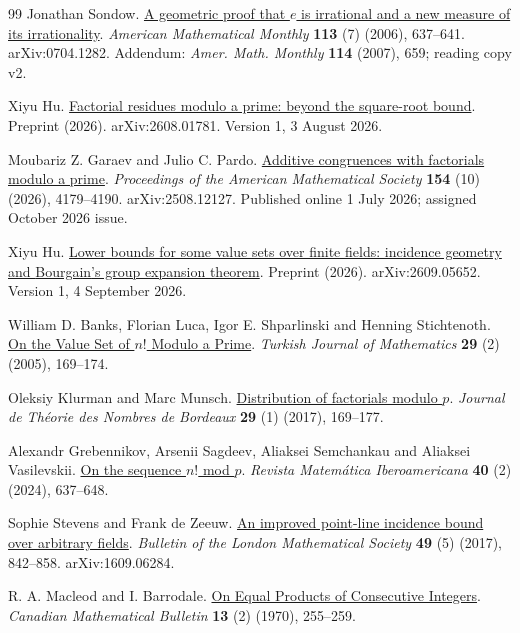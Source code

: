 \begin{thebibliography}{99}
Jonathan Sondow. \href{https://arxiv.org/abs/0704.1282v2}{A geometric proof that {$e$} is irrational and a new measure of its irrationality}.
\emph{American Mathematical Monthly} \textbf{113} (7) (2006), 637--641. arXiv:0704.1282. Addendum: \emph{Amer. Math. Monthly} \textbf{114} (2007), 659; reading copy v2.

Xiyu Hu. \href{https://arxiv.org/abs/2608.01781v1}{Factorial residues modulo a prime: beyond the square-root bound}.
Preprint (2026). arXiv:2608.01781. Version 1, 3 August 2026.

Moubariz Z. Garaev and Julio C. Pardo. \href{https://doi.org/10.1090/proc/17753}{Additive congruences with factorials modulo a prime}.
\emph{Proceedings of the American Mathematical Society} \textbf{154} (10) (2026), 4179--4190. arXiv:2508.12127. Published online 1 July 2026; assigned October 2026 issue.

Xiyu Hu. \href{https://arxiv.org/abs/2609.05652v1}{Lower bounds for some value sets over finite fields: incidence geometry and {Bourgain}'s group expansion theorem}.
Preprint (2026). arXiv:2609.05652. Version 1, 4 September 2026.

William D. Banks, Florian Luca, Igor E. Shparlinski and Henning Stichtenoth. \href{https://journals.tubitak.gov.tr/math/vol29/iss2/6/}{On the Value Set of $n!$ Modulo a Prime}.
\emph{Turkish Journal of Mathematics} \textbf{29} (2) (2005), 169--174.

Oleksiy Klurman and Marc Munsch. \href{https://doi.org/10.5802/jtnb.974}{Distribution of factorials modulo $p$}.
\emph{Journal de Théorie des Nombres de Bordeaux} \textbf{29} (1) (2017), 169--177.

Alexandr Grebennikov, Arsenii Sagdeev, Aliaksei Semchankau and Aliaksei Vasilevskii. \href{https://doi.org/10.4171/RMI/1422}{On the sequence $n!$ mod $p$}.
\emph{Revista Matemática Iberoamericana} \textbf{40} (2) (2024), 637--648.

Sophie Stevens and Frank de Zeeuw. \href{https://doi.org/10.1112/blms.12077}{An improved point-line incidence bound over arbitrary fields}.
\emph{Bulletin of the London Mathematical Society} \textbf{49} (5) (2017), 842--858. arXiv:1609.06284.

R. A. Macleod and I. Barrodale. \href{https://doi.org/10.4153/CMB-1970-052-8}{On Equal Products of Consecutive Integers}.
\emph{Canadian Mathematical Bulletin} \textbf{13} (2) (1970), 255--259.


\end{thebibliography}
